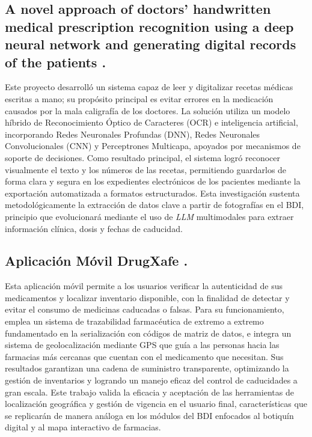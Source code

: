 \subsection{A novel approach of doctors' handwritten medical prescription recognition using a deep neural network and generating digital records of the patients \cite{novel}.}
Este proyecto desarrolló un sistema capaz de leer y digitalizar recetas médicas escritas a mano; su propósito principal es evitar errores en la medicación causados por la mala caligrafía de los doctores. La solución utiliza un modelo híbrido de Reconocimiento Óptico de Caracteres (OCR) e inteligencia artificial, incorporando Redes Neuronales Profundas (DNN), Redes Neuronales Convolucionales (CNN) y Perceptrones Multicapa, apoyados por mecanismos de soporte de decisiones. Como resultado principal, el sistema logró reconocer visualmente el texto y los números de las recetas, permitiendo guardarlos de forma clara y segura en los expedientes electrónicos de los pacientes mediante la exportación automatizada a formatos estructurados. Esta investigación sustenta metodológicamente la extracción de datos clave a partir de fotografías en el BDI, principio que evolucionará mediante el uso de \emph{LLM} multimodales para extraer información clínica, dosis y fechas de caducidad.

\subsection{Aplicación Móvil DrugXafe \cite{DrugXafe}.}
Esta aplicación móvil permite a los usuarios verificar la autenticidad de sus medicamentos y localizar inventario disponible, con la finalidad de detectar y evitar el consumo de medicinas caducadas o falsas. Para su funcionamiento, emplea un sistema de trazabilidad farmacéutica de extremo a extremo fundamentado en la serialización con códigos de matriz de datos, e integra un sistema de geolocalización mediante GPS que guía a las personas hacia las farmacias más cercanas que cuentan con el medicamento que necesitan. Sus resultados garantizan una cadena de suministro transparente, optimizando la gestión de inventarios y logrando un manejo eficaz del control de caducidades a gran escala. Este trabajo valida la eficacia y aceptación de las herramientas de localización geográfica y gestión de vigencia en el usuario final, características que se replicarán de manera análoga en los módulos del BDI enfocados al botiquín digital y al mapa interactivo de farmacias.

